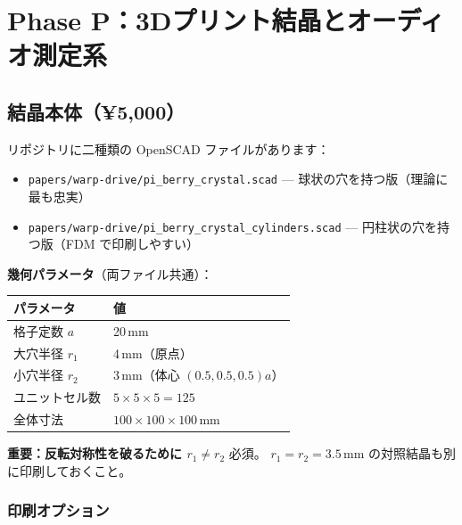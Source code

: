 \documentclass[11pt,a4paper]{article}
\begin{document}
\section{Phase P：3Dプリント結晶とオーディオ測定系}
\label{sec:phase_p}

\subsection{結晶本体（¥5,000）}

リポジトリに二種類の OpenSCAD ファイルがあります：

\begin{itemize}[leftmargin=2em]
  \item \texttt{papers/warp-drive/pi\_berry\_crystal.scad}
        — 球状の穴を持つ版（理論に最も忠実）
  \item \texttt{papers/warp-drive/pi\_berry\_crystal\_cylinders.scad}
        — 円柱状の穴を持つ版（FDM で印刷しやすい）
\end{itemize}

\textbf{幾何パラメータ}（両ファイル共通）：
\begin{center}
\begin{tabular}{ll}
\toprule
パラメータ & 値 \\
\midrule
格子定数 $a$ & 20\,mm \\
大穴半径 $r_1$ & 4\,mm（原点） \\
小穴半径 $r_2$ & 3\,mm（体心 $(0.5,0.5,0.5)a$） \\
ユニットセル数 & $5\times 5\times 5 = 125$ \\
全体寸法 & $100\times 100\times 100$\,mm \\
\bottomrule
\end{tabular}
\end{center}

\textbf{重要：反転対称性を破るために $r_1 \neq r_2$} 必須。
$r_1 = r_2 = 3.5$\,mm の対照結晶も別に印刷しておくこと。

\subsubsection{印刷オプション}
\end{document}
